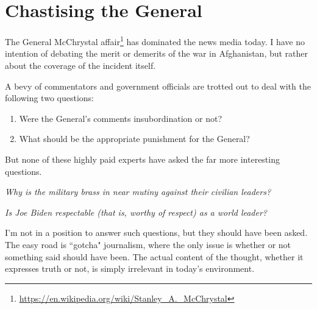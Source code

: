 \section{Chastising the General}

The General McChrystal affair\footnote{\url{https://en.wikipedia.org/wiki/Stanley_A._McChrystal}} has dominated the news media today. I have no intention of debating the merit or demerits of the war in Afghanistan, but rather about the coverage of the incident itself. 

A bevy of commentators and government officials are trotted out to deal with the following two questions: 

\begin{enumerate}
\item Were the General's comments insubordination or not? 
\item What should be the appropriate punishment for the General? 
\end{enumerate}
But none of these highly paid experts have asked the far more interesting questions. 

\emph{Why is the military brass in near mutiny against their civilian leaders?}

\emph{Is Joe Biden respectable (that is, worthy of respect) as a world leader?} 

I'm not in a position to answer such questions, but they should have been asked. The easy road is ``gotcha" journalism, where the only issue is whether or not something said should have been. The actual content of the thought, whether it expresses truth or not, is simply irrelevant in today's environment.



